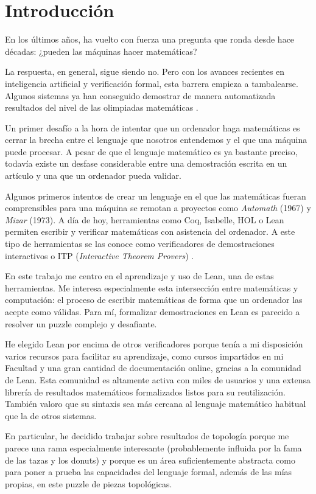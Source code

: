 \section{Introducción}

En los últimos años, ha vuelto con fuerza una pregunta que ronda desde hace décadas: ¿pueden las máquinas hacer matemáticas?

La respuesta, en general, sigue siendo no. Pero con los avances recientes en inteligencia artificial y verificación formal, esta barrera empieza a tambalearse. Algunos sistemas ya han conseguido demostrar de manera automatizada resultados del nivel de las olimpiadas matemáticas \cite{trinh2024solving}.

Un primer desafío a la hora de intentar que un ordenador haga matemáticas es cerrar la brecha entre el lenguaje que nosotros entendemos y el que una máquina puede procesar. A pesar de que el lenguaje matemático es ya bastante preciso, todavía existe un desfase considerable entre una demostración escrita en un artículo y una que un ordenador pueda validar.

Algunos primeros intentos de crear un lenguaje en el que las matemáticas fueran comprensibles para una máquina se remotan a proyectos como \textit{Automath} (1967) y \textit{Mizar} (1973). A día de hoy, herramientas como Coq, Isabelle, HOL o Lean permiten escribir y verificar matemáticas con asistencia del ordenador. A este tipo de herramientas se las conoce como verificadores de demostraciones interactivos o ITP (\textit{Interactive Theorem Provers}) \cite{geuvers2009proof}.

En este trabajo me centro en el aprendizaje y uso de Lean, una de estas herramientas. Me interesa especialmente esta intersección entre matemáticas y computación: el proceso de escribir matemáticas de forma que un ordenador las acepte como válidas. Para mí, formalizar demostraciones en Lean es parecido a resolver un puzzle complejo y desafiante.

He elegido Lean por encima de otros verificadores porque tenía a mi disposición varios recursos para facilitar su aprendizaje, como cursos impartidos en mi Facultad y una gran cantidad de documentación online, gracias a la comunidad de Lean. Esta comunidad es altamente activa con miles de usuarios y una extensa librería de resultados matemáticos formalizados listos para su reutilización. También valoro que su sintaxis sea más cercana al lenguaje matemático habitual que la de otros sistemas.

En particular, he decidido trabajar sobre resultados de topología porque me parece una rama especialmente interesante (probablemente influida por la fama de las tazas y los donuts) y porque es un área suficientemente abstracta como para poner a prueba las capacidades del lenguaje formal, además de las mías propias, en este puzzle de piezas topológicas.


